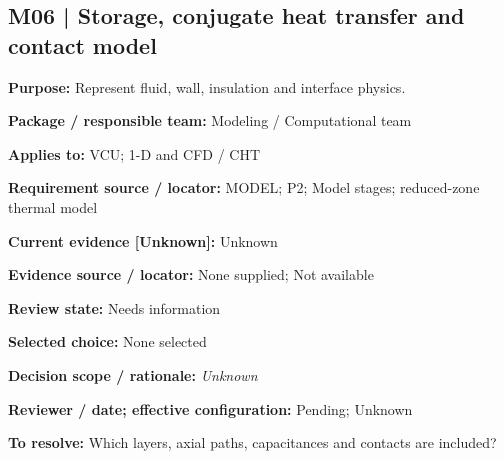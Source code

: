 \documentclass[11pt]{article}
\begin{document}
\par\noindent\begin{minipage}{\textwidth}\small\setlength{\parskip}{2pt}
\subsection*{M06 | Storage, conjugate heat transfer and contact model}
\textbf{Purpose:} Represent fluid, wall, insulation and interface physics.\par
\textbf{Package / responsible team:} Modeling / Computational team\par
\textbf{Applies to:} VCU; 1-D and CFD / CHT\par
\textbf{Requirement source / locator:} MODEL; P2; Model stages; reduced-zone thermal model\par
\textbf{Current evidence [Unknown]:} Unknown\par
\textbf{Evidence source / locator:} None supplied; Not available\par
\textbf{Review state:} Needs information\par
\textbf{Selected choice:} None selected\par
\textbf{Decision scope / rationale:} \textit{Unknown}\par
\textbf{Reviewer / date; effective configuration:} Pending; Unknown\par
\textbf{To resolve:} Which layers, axial paths, capacitances and contacts are included?\par
\end{minipage}\par\vspace{5pt}
\end{document}
